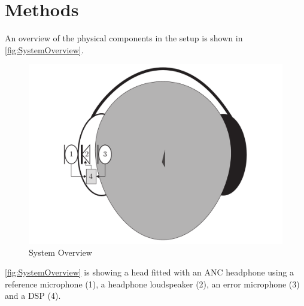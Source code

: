 

\section{Methods}
An overview of the physical components in the setup is shown in \autoref{fig:SystemOverview}.
\begin{figure}[H]
	\centering
	\includegraphics[width=1\columnwidth]{figures/ArticleIllustrations/SystemOverview}
	\caption{System Overview}
	\label{fig:SystemOverview}
\end{figure}
\autoref{fig:SystemOverview} is showing a head fitted with an ANC headphone using a reference microphone (1), a headphone loudspeaker (2), an error microphone (3) and a DSP (4).  

